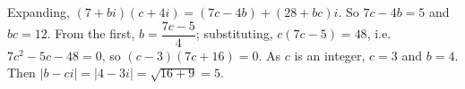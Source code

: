 Expanding, $(7+bi)(c+4i)=(7c-4b)+(28+bc)i$. So $7c-4b=5$ and $bc=12$. From the first, $b=\dfrac{7c-5}4$; substituting, $c(7c-5)=48$, i.e. $7c^2-5c-48=0$, so $(c-3)(7c+16)=0$. As $c$ is an integer, $c=3$ and $b=4$. Then $\left|b-ci\right|=\left|4-3i\right|=\sqrt{16+9}=\boxed{5}$.
